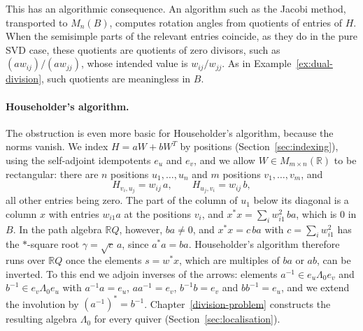 \documentclass[12pt, a4paper]{report}
\theoremstyle{plain}
\theoremstyle{definition}
\theoremstyle{remark}
\theoremstyle{plain}
\newcommand{\RR}{\mathbb{R}}
\begin{document}
This has an algorithmic consequence. An algorithm such as the Jacobi method, transported to $M_n(B)$, computes rotation angles from quotients of entries of $H$. When the semisimple parts of the relevant entries coincide, as they do in the pure SVD case, these quotients are quotients of zero divisors, such as $(aw_{ij})/(aw_{jj})$, whose intended value is $w_{ij}/w_{jj}$. As in Example~\ref{ex:dual-division}, such quotients are meaningless in $B$.

\paragraph{Householder's algorithm.} The obstruction is even more basic for Householder's algorithm, because the norms vanish. We index $H=aW+bW^T$ by positions (Section~\ref{sec:indexing}), using the self-adjoint idempotents $e_u$ and $e_v$, and we allow $W\in M_{m\times n}(\RR)$ to be rectangular: there are $n$ positions $u_1,\dots,u_n$ and $m$ positions $v_1,\dots,v_m$, and
\[ H_{v_i,u_j}=w_{ij}\,a,\qquad H_{u_j,v_i}=w_{ij}\,b , \]
all other entries being zero. The part of the column of $u_1$ below its diagonal is a column $x$ with entries $w_{i1}a$ at the positions $v_i$, and $x^*x=\sum_iw_{i1}^2\,ba$, which is $0$ in $B$. In the path algebra $\RR Q$, however, $ba\neq0$, and $x^*x=c\,ba$ with $c=\sum_iw_{i1}^2$ has the $*$-square root $\gamma=\sqrt c\,a$, since $a^*a=ba$. Householder's algorithm therefore runs over $\RR Q$ once the elements $s=w^*x$, which are multiples of $ba$ or $ab$, can be inverted. To this end we adjoin inverses of the arrows: elements $a^{-1}\in e_u\Lambda_0e_v$ and $b^{-1}\in e_v\Lambda_0e_u$ with $a^{-1}a=e_u$, $aa^{-1}=e_v$, $b^{-1}b=e_v$ and $bb^{-1}=e_u$, and we extend the involution by $(a^{-1})^*=b^{-1}$. Chapter~\ref{division-problem} constructs the resulting algebra $\Lambda_0$ for every quiver (Section~\ref{sec:localisation}).
\end{document}
